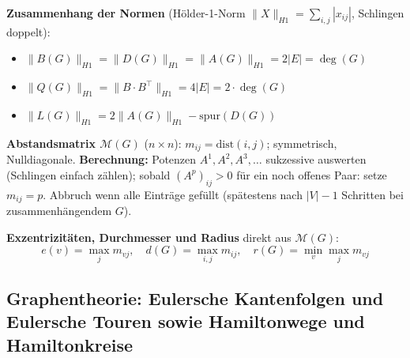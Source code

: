 \textbf{Zusammenhang der Normen} (Hölder-1-Norm $\|X\|_{H1}=\sum_{i,j}|x_{ij}|$, Schlingen doppelt):
\begin{itemize}[leftmargin=1.5em]
    \item $\|B(G)\|_{H1} = \|D(G)\|_{H1} = \|A(G)\|_{H1} = 2|E| = \deg(G)$
    \item $\|Q(G)\|_{H1} = \|B\cdot B^\top\|_{H1} = 4|E| = 2\cdot\deg(G)$
    \item $\|L(G)\|_{H1} = 2\|A(G)\|_{H1} - \mathrm{spur}(D(G))$
\end{itemize}

\textbf{Abstandsmatrix $\mathcal{M}(G)$} ($n\times n$): $m_{ij}=\mathrm{dist}(i,j)$; symmetrisch, Nulldiagonale. \textbf{Berechnung:} Potenzen $A^1, A^2, A^3,\ldots$ sukzessive auswerten (Schlingen einfach zählen); sobald $(A^p)_{ij}>0$ für ein noch offenes Paar: setze $m_{ij}=p$. Abbruch wenn alle Einträge gefüllt (spätestens nach $|V|-1$ Schritten bei zusammenhängendem $G$).

\textbf{Exzentrizitäten, Durchmesser und Radius} direkt aus $\mathcal{M}(G)$:
\[e(v)=\max_j m_{vj},\quad d(G)=\max_{i,j}m_{ij},\quad r(G)=\min_v\max_j m_{vj}\]


\newpage

\newpage

\subsection{Graphentheorie: Eulersche Kantenfolgen und Eulersche Touren sowie Hamiltonwege und Hamiltonkreise}

